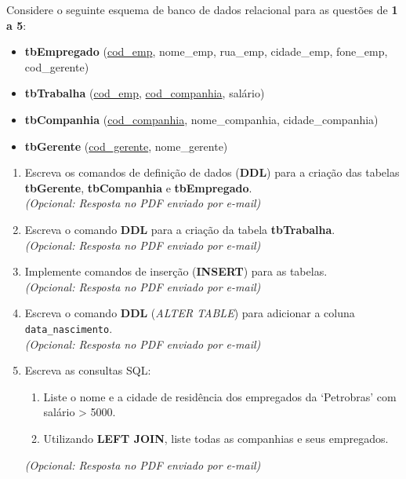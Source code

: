\documentclass[12pt,a4paper]{article}
\newcommand{\resposta}[1]{
\noindent
\framebox[\textwidth]{
\begin{minipage}{0.98\textwidth}
\vspace{#1}
\end{minipage}
}
}
\begin{document}
\vspace{0.3cm}

Considere o seguinte esquema de banco de dados relacional para as questões de \textbf{1 a 5}:
\begin{itemize}[label={}]
    \item \textbf{tbEmpregado} (\underline{cod\_emp}, nome\_emp, rua\_emp, cidade\_emp, fone\_emp, cod\_gerente)
    \item \textbf{tbTrabalha} (\underline{cod\_emp}, \underline{cod\_companhia}, salário)
    \item \textbf{tbCompanhia} (\underline{cod\_companhia}, nome\_companhia, cidade\_companhia)
    \item \textbf{tbGerente} (\underline{cod\_gerente}, nome\_gerente)
\end{itemize}

\vspace{0.3cm}

\begin{enumerate}
    \item Escreva os comandos de definição de dados (\textbf{DDL}) para a criação das tabelas \textbf{tbGerente}, \textbf{tbCompanhia} e \textbf{tbEmpregado}.\\
    \textit{(Opcional: Resposta no PDF enviado por e-mail)}\\
    \resposta{2cm}

    \item Escreva o comando \textbf{DDL} para a criação da tabela \textbf{tbTrabalha}.\\
    \textit{(Opcional: Resposta no PDF enviado por e-mail)}\\
    \resposta{2cm}

    \item Implemente comandos de inserção (\textbf{INSERT}) para as tabelas.\\
    \textit{(Opcional: Resposta no PDF enviado por e-mail)}\\
    \resposta{2cm}

    \item Escreva o comando \textbf{DDL} (\textit{ALTER TABLE}) para adicionar a coluna \texttt{data\_nascimento}.\\
    \textit{(Opcional: Resposta no PDF enviado por e-mail)}\\
    \resposta{2cm}

    \item Escreva as consultas SQL:
    \begin{enumerate}[label=\alph*)]
        \item Liste o nome e a cidade de residência dos empregados da `Petrobras' com salário > 5000.
        \item Utilizando \textbf{LEFT JOIN}, liste todas as companhias e seus empregados.
    \end{enumerate}
    \textit{(Opcional: Resposta no PDF enviado por e-mail)}\\
    \resposta{2cm}
\end{enumerate}

\vspace{0.5cm} 
\end{document}
